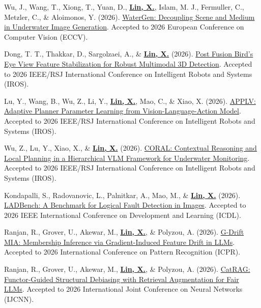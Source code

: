\documentclass[a4paper,11pt]{article}
\begin{document}
\item[\textbf{[C.20]}] Wu, J., Wang, T., Xiong, T., Yuan, D., \textbf{\underline{Lin, X.}}, Islam, M. J., Fermuller, C., Metzler, C., \& Aloimonos, Y. (2026). \href{https://openreview.net/forum?id=86HyQOUle8}{WaterGen: Decoupling Scene and Medium in Underwater Image Generation}. Accepted to 2026 European Conference on Computer Vision (ECCV).

\item[\textbf{[C.19]}] Dong, T. T., Thakkar, D., Sargolzaei, A., \& \textbf{\underline{Lin, X.}} (2026). \href{https://arxiv.org/pdf/2603.05623}{Post Fusion Bird's Eye View Feature Stabilization for Robust Multimodal 3D Detection}. Accepted to 2026 IEEE/RSJ International Conference on Intelligent Robots and Systems (IROS).
\item[\textbf{[C.18]}] Lu, Y., Wang, B., Wu, Z., Li, Y., \textbf{\underline{Lin, X.}}, Mao, C., \& Xiao, X. (2026). \href{https://arxiv.org/pdf/2603.08862}{APPLV: Adaptive Planner Parameter Learning from Vision-Language-Action Model}. Accepted to 2026 IEEE/RSJ International Conference on Intelligent Robots and Systems (IROS).
\item[\textbf{[C.17]}] Wu, Z., Lu, Y., Xiao, X., \& \textbf{\underline{Lin, X.}} (2026). \href{https://arxiv.org/pdf/2603.14786}{CORAL: Contextual Reasoning and Local Planning in a Hierarchical VLM Framework for Underwater Monitoring}. Accepted to 2026 IEEE/RSJ International Conference on Intelligent Robots and Systems (IROS).

\item[\textbf{[C.16]}] Kondapalli, S., Radovanovic, L., Palnitkar, A., Mao, M., \& \textbf{\underline{Lin, X.}} (2026). \href{https://arxiv.org/pdf/2606.17433}{LADBench: A Benchmark for Logical Fault Detection in Images}. Accepted to 2026 IEEE International Conference on Development and Learning (ICDL).

\item[\textbf{[C.15]}] Ranjan, R., Grover, U., Akewar, M., \textbf{\underline{Lin, X.}}, \& Polyzou, A. (2026). \href{https://arxiv.org/pdf/2604.00419}{G-Drift MIA: Membership Inference via Gradient-Induced Feature Drift in LLMs}. Accepted to 2026 International Conference on Pattern Recognition (ICPR).

\item[\textbf{[C.14]}] Ranjan, R., Grover, U., Akewar, M., \textbf{\underline{Lin, X.}}, \& Polyzou, A. (2026). \href{https://arxiv.org/abs/2603.21524}{CatRAG: Functor-Guided Structural Debiasing with Retrieval Augmentation for Fair LLMs}. Accepted to 2026 International Joint Conference on Neural Networks (IJCNN).
\end{document}
